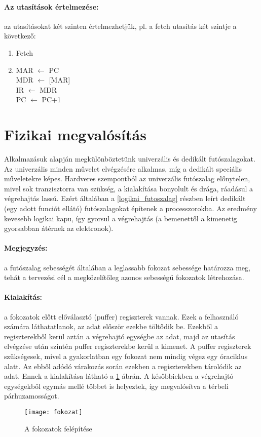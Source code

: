 \paragraph{Az utasítások értelmezése:} az utasításokat két szinten értelmezhetjük, pl. a fetch utasítás két szintje a következő:
\begin{enumerate}
    \item Fetch
    \item MAR $\leftarrow$ PC\\
    MDR $\leftarrow$ [MAR] \\
    IR $\leftarrow$ MDR \\
    PC $\leftarrow$ PC+1
\end{enumerate}

\section{Fizikai megvalósítás}
Alkalmazásuk alapján megkülönböztetünk univerzális és dedikált futószalagokat.
Az univerzális minden művelet elvégzésére alkalmas, míg a dedikált speciális műveletekre képes.
Hardveres szempontból az univerzális futószalag előnytelen, mivel sok tranzisztorra van szükség, a kialakítása bonyolult és drága, ráadásul a végrehajtás lassú.
Ezért általában a \ref{logikai_futoszalag} részben leírt dedikált (egy adott funciót ellátó) futószalagokat építenek a processzorokba.
Az eredmény kevesebb logikai kapu, így gyorsul a végrehajtás (a bemenettől a kimenetig gyorsabban átérnek az elektronok).
\paragraph{Megjegyzés:} a futószalag sebességét általában a leglassabb fokozat sebessége határozza meg, tehát a tervezési cél a megközelítőleg azonos sebességű fokozatok létrehozása.
\paragraph{Kialakítás:} a fokozatok előtt előválasztó (puffer) regiszterek vannak. Ezek a felhasználó számára láthatatlanok, az adat először ezekbe töltődik be.
Ezekből a regiszterekből kerül aztán a végrehajtó egységbe az adat, majd az utasítás elvégzése után szintén puffer regiszterekbe kerül a kimenet.
A puffer regiszterek szükségesek, mivel a gyakorlatban egy fokozat nem mindig végez egy óraciklus alatt.
Az ebből adódó várakozás során ezekben a regiszterekben tárolódik az adat.
Ennek a kialakítása látható a \ref{fig:fokozat} ábrán.
A későbbiekben a végrehajtó egységekből egymás mellé többet is helyeztek, így megvalósítva a térbeli párhuzamosságot.
\begin{figure}[h]
    \texttt{[image: fokozat]}
    \centering
    \caption{A fokozatok felépítése}
    \label{fig:fokozat}
\end{figure}

